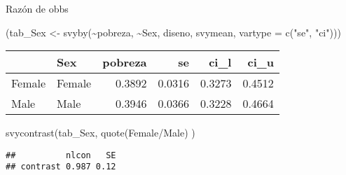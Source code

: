 \documentclass[
  ignorenonframetext,
]{beamer}
\newenvironment{Shaded}{\begin{snugshade}}{\end{snugshade}}
\newcommand{\AttributeTok}[1]{\textcolor[rgb]{0.77,0.63,0.00}{#1}}
\newcommand{\FunctionTok}[1]{\textcolor[rgb]{0.00,0.00,0.00}{#1}}
\newcommand{\NormalTok}[1]{#1}
\newcommand{\OtherTok}[1]{\textcolor[rgb]{0.56,0.35,0.01}{#1}}
\newcommand{\SpecialCharTok}[1]{\textcolor[rgb]{0.00,0.00,0.00}{#1}}
\newcommand{\StringTok}[1]{\textcolor[rgb]{0.31,0.60,0.02}{#1}}
\begin{document}
\begin{frame}[fragile]{Razón de obbs}
\protect\hypertarget{razuxf3n-de-obbs}{}
\begin{Shaded}
\begin{Highlighting}[]
\NormalTok{(tab\_Sex }\OtherTok{\textless{}{-}} \FunctionTok{svyby}\NormalTok{(}\SpecialCharTok{\textasciitilde{}}\NormalTok{pobreza,  }\SpecialCharTok{\textasciitilde{}}\NormalTok{Sex, diseno,}
\NormalTok{                 svymean, }\AttributeTok{vartype =} \FunctionTok{c}\NormalTok{(}\StringTok{"se"}\NormalTok{, }\StringTok{"ci"}\NormalTok{)))}
\end{Highlighting}
\end{Shaded}

\begin{longtable}[]{@{}llrrrr@{}}
\toprule
& Sex & pobreza & se & ci\_l & ci\_u \\
\midrule
\endhead
Female & Female & 0.3892 & 0.0316 & 0.3273 & 0.4512 \\
Male & Male & 0.3946 & 0.0366 & 0.3228 & 0.4664 \\
\bottomrule
\end{longtable}

\begin{Shaded}
\begin{Highlighting}[]
\FunctionTok{svycontrast}\NormalTok{(tab\_Sex, }\FunctionTok{quote}\NormalTok{(}\StringTok{\textasciigrave{}}\AttributeTok{Female}\StringTok{\textasciigrave{}}\SpecialCharTok{/}\StringTok{\textasciigrave{}}\AttributeTok{Male}\StringTok{\textasciigrave{}}\NormalTok{)  )}
\end{Highlighting}
\end{Shaded}

\begin{verbatim}
##          nlcon   SE
## contrast 0.987 0.12
\end{verbatim}
\end{frame}
\end{document}
